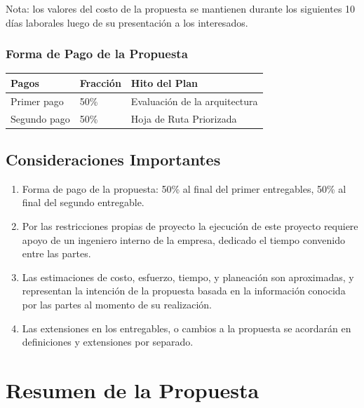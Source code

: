 \documentclass[
	a4paper, %
	12pt, %
]{include/CSSullivanBusinessReport}
\def\tightlist{}
\begin{document}
Nota: los valores del costo de la propuesta se mantienen durante los
siguientes 10 días laborales luego de su presentación a los interesados.

\subsubsection{Forma de Pago de la
Propuesta}\label{sec:forma-de-pago-de-la-propuesta}

\begin{longtable}[]{@{}lll@{}}
\toprule\noalign{}
Pagos & Fracción & Hito del Plan \\
\midrule\noalign{}
\endhead
\bottomrule\noalign{}
\endlastfoot
Primer pago & 50\% & Evaluación de la arquitectura \\
Segundo pago & 50\% & Hoja de Ruta Priorizada \\
\end{longtable}

\subsection{Consideraciones
Importantes}\label{sec:consideraciones-importantes}

\begin{quote}
\end{quote}

\begin{enumerate}
\def\labelenumi{\arabic{enumi}.}
\tightlist
\item
  Forma de pago de la propuesta: 50\% al final del primer entregables,
  50\% al final del segundo entregable.
\item
  Por las restricciones propias de proyecto la ejecución de este
  proyecto requiere apoyo de un ingeniero interno de la empresa,
  dedicado el tiempo convenido entre las partes.
\item
  Las estimaciones de costo, esfuerzo, tiempo, y planeación son
  aproximadas, y representan la intención de la propuesta basada en la
  información conocida por las partes al momento de su realización.
\item
  Las extensiones en los entregables, o cambios a la propuesta se
  acordarán en definiciones y extensiones por separado.
\end{enumerate}

\newpage

\section{Resumen de la Propuesta}\label{sec:resumen-de-la-propuesta}
\end{document}
